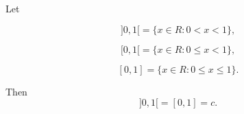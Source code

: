 Let

$$]0, 1[ = \{x \in R : 0 < x < 1\},$$

$$[0, 1[ = \{x \in R : 0 \leq x < 1\},$$

$$[0, 1] = \{x \in R : 0 \leq x \leq 1\}.$$

Then $$]0, 1[ = [0, 1] = c.$$